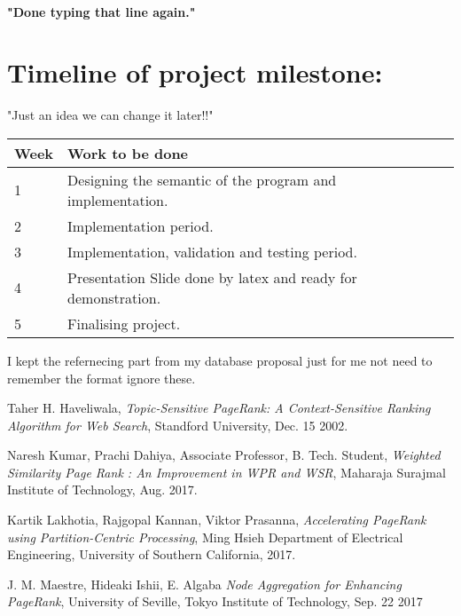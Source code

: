 \documentclass[12pt]{article}
\begin{document}
\paragraph{"Done typing that line again."}

\section{Timeline of project milestone:}
"Just an idea we can change it later!!"
\begin{center}
    \begin{tabular}{| l | l | l | l |}
    \hline
    Week & Work to be done \\ \hline
    1 &  Designing the semantic of the program and implementation.\\ \hline
    2 &  Implementation period.\\ \hline
    3 &  Implementation, validation and testing period.\\ \hline
    4 &  Presentation Slide done by latex and ready for demonstration. \\ \hline
    5 &  Finalising project. \\ \hline
    
    \end{tabular}
\end{center}


I kept the refernecing part from my database proposal just for me not need to remember the format ignore these.
\begin{thebibliography}{1}

	Taher H. Haveliwala,
	{\em Topic-Sensitive PageRank:
A Context-Sensitive Ranking Algorithm for Web Search},
	Standford University,
	Dec. 15 2002.
	
	Naresh Kumar, Prachi Dahiya, Associate Professor, B. Tech. Student,
	{\em Weighted Similarity Page Rank : An Improvement in WPR and WSR},
	Maharaja Surajmal Institute of Technology,
	Aug. 2017.
	
	Kartik Lakhotia, Rajgopal Kannan, Viktor Prasanna,
	{\em Accelerating PageRank using Partition-Centric Processing},
	Ming Hsieh Department of Electrical Engineering, University of Southern California,
	2017.
	
J. M. Maestre, Hideaki Ishii, E. Algaba	
	{\em Node Aggregation for Enhancing PageRank},
	University of Seville,
	Tokyo Institute of Technology,
	Sep. 22 2017
	
\end{thebibliography}
\end{document}
